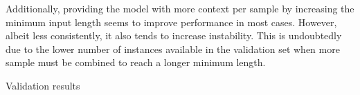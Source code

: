 \documentclass[12pt]{report}
\begin{document}
Additionally, providing the model with more context per sample by increasing the minimum input length seems to improve performance in most cases.
However, albeit less consistently, it also tends to increase instability.
This is undoubtedly due to the lower number of instances available in the validation set when more sample must be combined to reach a longer minimum length.
\begin{table}
\begin{adjustbox}{width=1\textwidth}
    
\end{adjustbox}
\caption{Validation results}
\label{tab: val results}
\end{table}

\end{document}
